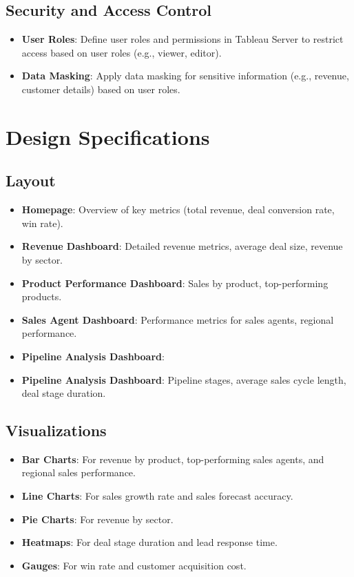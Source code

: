 \documentclass{article}
\begin{document}
\subsection{Security and Access Control}
\begin{itemize}
    \item \textbf{User Roles}: Define user roles and permissions in Tableau Server to restrict access based on user roles (e.g., viewer, editor).
    \item \textbf{Data Masking}: Apply data masking for sensitive information (e.g., revenue, customer details) based on user roles.
\end{itemize}

\section{Design Specifications}

\subsection{Layout}
\begin{itemize}
    \item \textbf{Homepage}: Overview of key metrics (total revenue, deal conversion rate, win rate).
    \item \textbf{Revenue Dashboard}: Detailed revenue metrics, average deal size, revenue by sector.
    \item \textbf{Product Performance Dashboard}: Sales by product, top-performing products.
    \item \textbf{Sales Agent Dashboard}: Performance metrics for sales agents, regional performance.
    \item \textbf{Pipeline Analysis Dashboard}:
    \item \textbf{Pipeline Analysis Dashboard}: Pipeline stages, average sales cycle length, deal stage duration.
\end{itemize}

\subsection{Visualizations}
\begin{itemize}
    \item \textbf{Bar Charts}: For revenue by product, top-performing sales agents, and regional sales performance.
    \item \textbf{Line Charts}: For sales growth rate and sales forecast accuracy.
    \item \textbf{Pie Charts}: For revenue by sector.
    \item \textbf{Heatmaps}: For deal stage duration and lead response time.
    \item \textbf{Gauges}: For win rate and customer acquisition cost.
\end{itemize}
\end{document}
